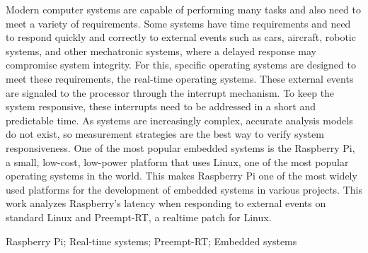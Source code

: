 \abstract
Modern computer systems are capable of performing many tasks and also need to meet a variety of requirements. Some systems have time requirements and need to respond quickly and correctly to external events such as cars, aircraft, robotic systems, and other mechatronic systems, where a delayed response may compromise system integrity. For this, specific operating systems are designed to meet these requirements, the real-time operating systems. These external events are signaled to the processor through the interrupt mechanism. To keep the system responsive, these interrupts need to be addressed in a short and predictable time. As systems are increasingly complex, accurate analysis models do not exist, so measurement strategies are the best way to verify system responsiveness. One of the most popular embedded systems is the Raspberry Pi, a small, low-cost, low-power platform that uses Linux, one of the most popular operating systems in the world. This makes Raspberry Pi one of the most widely used platforms for the development of embedded systems in various projects. This work analyzes Raspberry's latency when responding to external events on standard Linux and Preempt-RT, a realtime patch for Linux.

\begin{keywords}
Raspberry Pi; Real-time systems; Preempt-RT; Embedded systems
\end{keywords}
